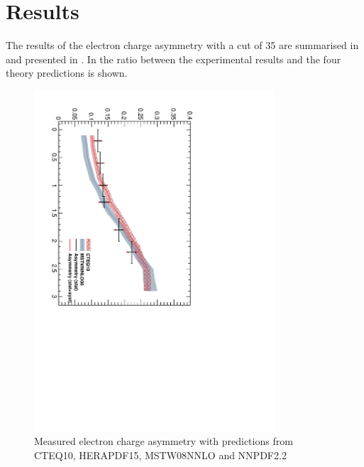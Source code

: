 \section{Results}
The results of the electron charge asymmetry with a \pT cut of \unit{35}{\GeV}
are summarised in  and presented in
.
In  the ratio between the experimental results and the four theory predictions is shown.


\begin{figure}[htbp]
  \begin{center}
\includegraphics*[width=0.80\textwidth]{Asym_35}
  \caption{\label{fig:updatedasym35} Measured electron charge asymmetry with predictions from CTEQ10, HERAPDF15, MSTW08NNLO and NNPDF2.2}
  \end{center}
\end{figure}

